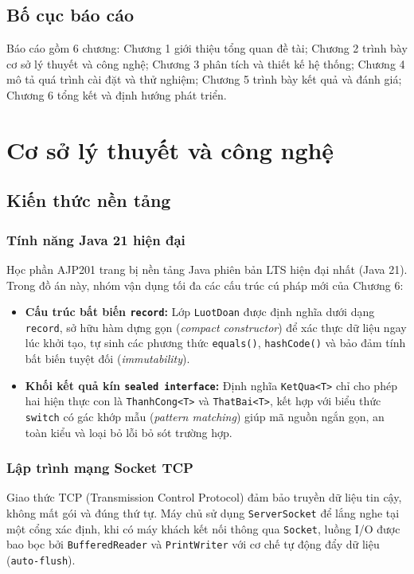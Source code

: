 \documentclass[12pt,a4paper,oneside]{report}
\begin{document}
\section{Bố cục báo cáo}
Báo cáo gồm 6 chương:
Chương 1 giới thiệu tổng quan đề tài; Chương 2 trình bày cơ sở lý thuyết và công nghệ; Chương 3 phân tích và thiết kế hệ thống; Chương 4 mô tả quá trình cài đặt và thử nghiệm; Chương 5 trình bày kết quả và đánh giá; Chương 6 tổng kết và định hướng phát triển.

\chapter{Cơ sở lý thuyết và công nghệ}

\section{Kiến thức nền tảng}
\subsection{Tính năng Java 21 hiện đại}
Học phần AJP201 trang bị nền tảng Java phiên bản LTS hiện đại nhất (Java 21). Trong đồ án này, nhóm vận dụng tối đa các cấu trúc cú pháp mới của Chương 6:
\begin{itemize}
  \item \textbf{Cấu trúc bất biến \texttt{record}:} Lớp \texttt{LuotDoan} được định nghĩa dưới dạng \texttt{record}, sở hữu hàm dựng gọn (\textit{compact constructor}) để xác thực dữ liệu ngay lúc khởi tạo, tự sinh các phương thức \texttt{equals()}, \texttt{hashCode()} và bảo đảm tính bất biến tuyệt đối (\textit{immutability}).
  \item \textbf{Khối kết quả kín \texttt{sealed interface}:} Định nghĩa \texttt{KetQua<T>} chỉ cho phép hai hiện thực con là \texttt{ThanhCong<T>} và \texttt{ThatBai<T>}, kết hợp với biểu thức \texttt{switch} có gác khớp mẫu (\textit{pattern matching}) giúp mã nguồn ngắn gọn, an toàn kiểu và loại bỏ lỗi bỏ sót trường hợp.
\end{itemize}

\subsection{Lập trình mạng Socket TCP}
Giao thức TCP (Transmission Control Protocol) đảm bảo truyền dữ liệu tin cậy, không mất gói và đúng thứ tự. Máy chủ sử dụng \texttt{ServerSocket} để lắng nghe tại một cổng xác định, khi có máy khách kết nối thông qua \texttt{Socket}, luồng I/O được bao bọc bởi \texttt{BufferedReader} và \texttt{PrintWriter} với cơ chế tự động đẩy dữ liệu (\texttt{auto-flush}).
\end{document}
